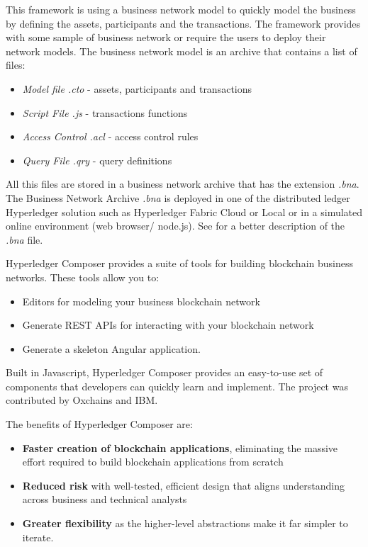 This framework is using a business network model to quickly model the business by defining the assets, participants and the transactions. The framework provides with some sample of business network or require the users to deploy their network models.
The business network model is an archive that contains a list of files:
\begin{itemize}
	\item \emph{Model file .cto} - assets, participants and transactions
	\item \emph{Script File .js} - transactions functions
	\item \emph{Access Control .acl} - access control rules
	\item \emph{Query File .qry} - query definitions
\end{itemize}
All this files are stored in a business network archive that has the extension \emph{.bna}.
The Business Network Archive \emph{.bna} is deployed in one of the distributed ledger Hyperledger solution such as Hyperledger Fabric Cloud or Local or in a simulated online environment (web browser/ node.js). See  for a better description of the \emph{.bna} file. 


Hyperledger Composer provides a suite of tools for building blockchain business networks. These tools allow you to:
\begin{itemize}
	\item Editors for modeling your business blockchain network
	\item Generate REST APIs for interacting with your blockchain network
	\item Generate a skeleton Angular application.
\end{itemize}

Built in Javascript, Hyperledger Composer provides an easy-to-use set of components that developers can quickly learn and implement. The project was contributed by Oxchains and IBM.

The benefits of Hyperledger Composer are:
\begin{itemize}
	\item \textbf{Faster creation of blockchain applications}, eliminating the massive effort required to build blockchain applications from scratch
	\item \textbf{Reduced risk} with well-tested, efficient design that aligns understanding across business and technical analysts
	\item \textbf{Greater flexibility} as the higher-level abstractions make it far simpler to iterate.
\end{itemize}

